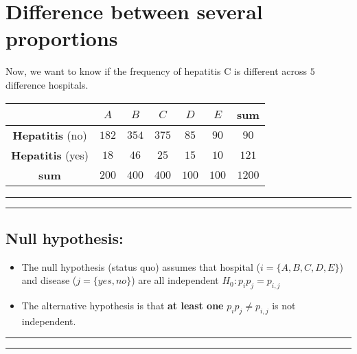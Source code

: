 \documentclass[
]{book}
\begin{document}
\hypertarget{difference-between-several-proportions}{%
\section{Difference between several proportions}\label{difference-between-several-proportions}}

Now, we want to know if the frequency of hepatitis C is different across \(5\) difference hospitals.

\begin{longtable}[]{@{}ccccccc@{}}
\toprule
& \(A\) & \(B\) & \(C\) & \(D\) & \(E\) & sum \\
\midrule
\endhead
\textbf{Hepatitis} (no) & \(182\) & \(354\) & \(375\) & \(85\) & \(90\) & \(90\) \\
\textbf{Hepatitis} (yes) & \(18\) & \(46\) & \(25\) & \(15\) & \(10\) & \(121\) \\
\textbf{sum} & \(200\) & \(400\) & \(400\) & \(100\) & \(100\) & \(1200\) \\
\bottomrule
\end{longtable}

\begin{center}\rule{0.5\linewidth}{0.5pt}\end{center}

\begin{center}\rule{0.5\linewidth}{0.5pt}\end{center}

\hypertarget{null-hypothesis-3}{%
\subsection{Null hypothesis:}\label{null-hypothesis-3}}

\begin{itemize}
\item
  The null hypothesis (status quo) assumes that hospital (\(i=\{A,B,C,D,E\}\)) and disease (\(j=\{yes, no\}\)) are all independent \(H_0: p_ip_j=p_{i,j}\)
\item
  The alternative hypothesis is that \textbf{at least one} \(p_ip_j\neq p_{i,j}\) is not independent.
\end{itemize}

\begin{center}\rule{0.5\linewidth}{0.5pt}\end{center}

\begin{center}\rule{0.5\linewidth}{0.5pt}\end{center}
\end{document}
